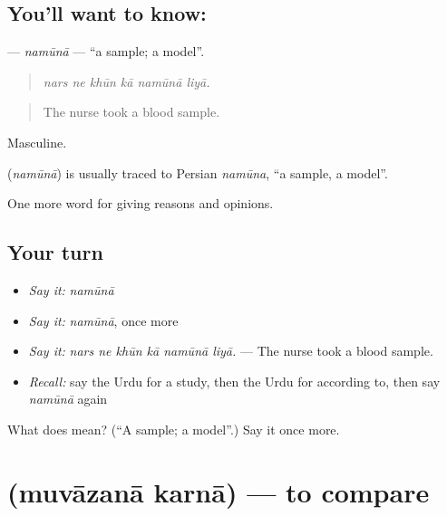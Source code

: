 \subsection*{You'll want to know: }
\textbf{} — \emph{namūnā} — \textquotedblleft{}a sample; a model\textquotedblright{}.

\begin{quote}
     
\end{quote}

\begin{quote}
\emph{nars ne khūn kā namūnā liyā.}
\end{quote}

\begin{quote}
The nurse took a blood sample.
\end{quote}

Masculine.

\begin{cousinweb}
\textbf{} (\emph{namūnā}) is usually traced to Persian \emph{namūna}, \textquotedblleft{}a sample, a model\textquotedblright{}.
\end{cousinweb}

\begin{grammarlens}[title={What you've built}]
One more word for giving reasons and opinions.
\end{grammarlens}

\subsection*{Your turn}
\begin{itemize}
\raggedright
  \item \emph{Say it:} \emph{namūnā}
  \item \emph{Say it:} \emph{namūnā}, once more
  \item \emph{Say it:} \emph{nars ne khūn kā namūnā liyā.} — The nurse took a blood sample.
  \item \emph{Recall:} say the Urdu for a study, then the Urdu for according to, then say \emph{namūnā} again
\end{itemize}

\begin{tcolorbox}[breakable,colback=teal!4,colframe=teal!35!black,title={Before you move on}]
What does  mean? (\textquotedblleft{}A sample; a model\textquotedblright{}.) Say it once more.
\end{tcolorbox}
\section[\texorpdfstring{\ur{موازنہ} \ur{کرنا} (muvāzanā karnā)}{موازنہ کرنا (muvāzanā karnā)}]{  (muvāzanā karnā) — to compare}

